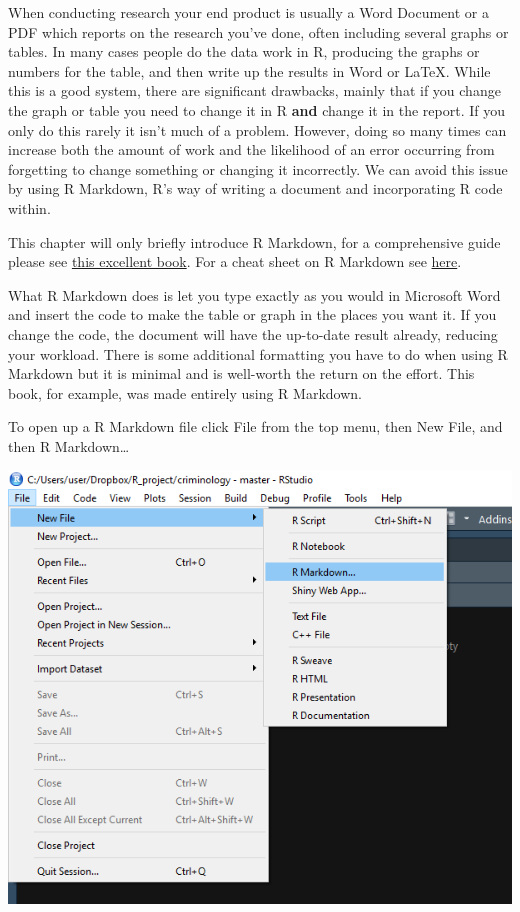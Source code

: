 \documentclass[
  12pt,
  openany]{book}
\begin{document}
When conducting research your end product is usually a Word Document or a PDF which reports on the research you've done, often including several graphs or tables. In many cases people do the data work in R, producing the graphs or numbers for the table, and then write up the results in Word or LaTeX. While this is a good system, there are significant drawbacks, mainly that if you change the graph or table you need to change it in R \textbf{and} change it in the report. If you only do this rarely it isn't much of a problem. However, doing so many times can increase both the amount of work and the likelihood of an error occurring from forgetting to change something or changing it incorrectly. We can avoid this issue by using R Markdown, R's way of writing a document and incorporating R code within.

This chapter will only briefly introduce R Markdown, for a comprehensive guide please see \href{https://bookdown.org/yihui/rmarkdown/}{this excellent book}. For a cheat sheet on R Markdown see \href{https://www.rstudio.com/wp-content/uploads/2015/02/rmarkdown-cheatsheet.pdf}{here}.

What R Markdown does is let you type exactly as you would in Microsoft Word and insert the code to make the table or graph in the places you want it. If you change the code, the document will have the up-to-date result already, reducing your workload. There is some additional formatting you have to do when using R Markdown but it is minimal and is well-worth the return on the effort. This book, for example, was made entirely using R Markdown.

To open up a R Markdown file click File from the top menu, then New File, and then R Markdown\ldots{}

\includegraphics{images/markdown1.png}
\end{document}
